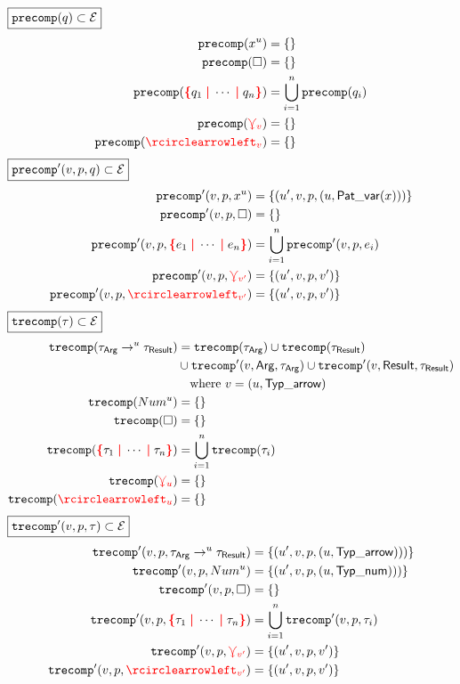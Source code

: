 %
$\boxed{\operatorname{\texttt{precomp}}\mathopen{}\left(q\right)\mathclose{} \subset \mathcal{E}}$
%
\begin{align*}
  \precomp{\varPat{x}{u}} &= \SetOf{}
  \\
  \precomp{\hole} &= \SetOf{}
  \\
  \precomp{\conflictHole{q_1, \cdots, q_n}}
  &= \bigcup_{i=1}^n \precomp{q_i}
  \\
  \precomp{\multiVertex{v}} &= \SetOf{}
  \\
  \precomp{\cycleVertex{v}} &= \SetOf{}
\end{align*}
%
$\boxed{\operatorname{\operatorname{\texttt{precomp}}^\prime}\mathopen{}\left(v, p, q\right)\mathclose{} \subset \mathcal{E}}$
%
\begin{align*}
  \precompPrime{v}{p}{\varPat{x}{u}}
  &= \SetOf{(u', v, p, (u, \PatVar(x)))}
  \\
  \precompPrime{v}{p}{\hole} &= \SetOf{}
  \\
  \precompPrime{v}{p}{\conflictHole{e_1, \cdots, e_n}}
  &= \bigcup_{i=1}^n \precompPrime{v}{p}{e_i}
  \\
  \precompPrime{v}{p}{\multiVertex{v'}}
  &= \SetOf{(u', v, p, v')}
  \\
  \precompPrime{v}{p}{\cycleVertex{v'}}
  &= \SetOf{(u', v, p, v')}
\end{align*}
%
$\boxed{\operatorname{\texttt{trecomp}}\mathopen{}\left(\tau\right)\mathclose{} \subset \mathcal{E}}$
%
\begin{align*}
  \trecomp{\arrowTyp{\tau_\ArrowArg}{u}{\tau_\ArrowResult}}
  &= \trecomp{\tau_\ArrowArg}
  \cup \trecomp{\tau_\ArrowResult} \\
  &\cup \trecompPrime{v}{\ArrowArg}{\tau_\ArrowArg}
  \cup \trecompPrime{v}{\ArrowResult}{\tau_\ArrowResult} \\
  &\quad\text{where } v = (u, \TypArrow)
  \\
  \trecomp{\numTyp{u}} &= \SetOf{}
  \\
  \trecomp{\hole} &= \SetOf{}
  \\
  \trecomp{\conflictHole{\tau_1, \cdots, \tau_n}}
  &= \bigcup_{i=1}^n \trecomp{\tau_i}
  \\
  \trecomp{\multiVertex{u}} &= \SetOf{}
  \\
  \trecomp{\cycleVertex{u}} &= \SetOf{}
\end{align*}
%
$\boxed{\operatorname{\operatorname{\texttt{trecomp}}^\prime}\mathopen{}\left(v, p, \tau\right)\mathclose{} \subset \mathcal{E}}$
%
\begin{align*}
  \trecompPrime{v}{p}{\arrowTyp{\tau_\ArrowArg}{u}{\tau_\ArrowResult}}
  &= \SetOf{(u', v, p, (u, \TypArrow)))}
  \\
  \trecompPrime{v}{p}{\numTyp{u}}
  &= \SetOf{(u', v, p, (u, \TypNum)))}
  \\
  \trecompPrime{v}{p}{\hole} &= \SetOf{}
  \\
  \trecompPrime{v}{p}{\conflictHole{\tau_1, \cdots, \tau_n}}
  &= \bigcup_{i=1}^n \trecompPrime{v}{p}{\tau_i}
  \\
  \trecompPrime{v}{p}{\multiVertex{v'}}
  &= \SetOf{(u', v, p, v')}
  \\
  \trecompPrime{v}{p}{\cycleVertex{v'}}
  &= \SetOf{(u', v, p, v')}
\end{align*}

